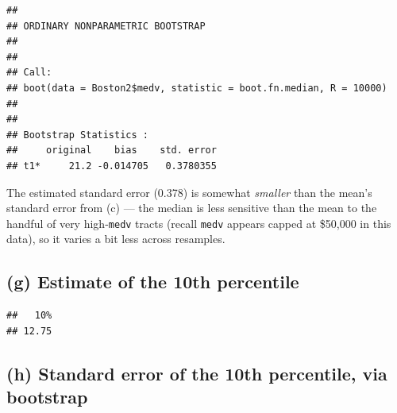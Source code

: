 \documentclass[
  11pt,
]{article}
\newenvironment{Shaded}{\begin{snugshade}}{\end{snugshade}}
\newcommand{\AttributeTok}[1]{\textcolor[rgb]{0.13,0.29,0.53}{#1}}
\newcommand{\ControlFlowTok}[1]{\textcolor[rgb]{0.13,0.29,0.53}{\textbf{#1}}}
\newcommand{\DecValTok}[1]{\textcolor[rgb]{0.00,0.00,0.81}{#1}}
\newcommand{\FloatTok}[1]{\textcolor[rgb]{0.00,0.00,0.81}{#1}}
\newcommand{\FunctionTok}[1]{\textcolor[rgb]{0.13,0.29,0.53}{\textbf{#1}}}
\newcommand{\NormalTok}[1]{#1}
\newcommand{\OtherTok}[1]{\textcolor[rgb]{0.56,0.35,0.01}{#1}}
\newcommand{\SpecialCharTok}[1]{\textcolor[rgb]{0.81,0.36,0.00}{\textbf{#1}}}
\begin{document}
\begin{verbatim}
## 
## ORDINARY NONPARAMETRIC BOOTSTRAP
## 
## 
## Call:
## boot(data = Boston2$medv, statistic = boot.fn.median, R = 10000)
## 
## 
## Bootstrap Statistics :
##     original    bias    std. error
## t1*     21.2 -0.014705   0.3780355
\end{verbatim}

The estimated standard error (0.378) is somewhat \emph{smaller} than the
mean's standard error from (c) --- the median is less sensitive than the
mean to the handful of very high-\texttt{medv} tracts (recall
\texttt{medv} appears capped at \$50,000 in this data), so it varies a
bit less across resamples.

\subsection{(g) Estimate of the 10th
percentile}\label{g-estimate-of-the-10th-percentile}

\begin{Shaded}
\end{Shaded}

\begin{verbatim}
##   10% 
## 12.75
\end{verbatim}

\subsection{(h) Standard error of the 10th percentile, via
bootstrap}\label{h-standard-error-of-the-10th-percentile-via-bootstrap}

\begin{Shaded}
\end{Shaded}
\end{document}
